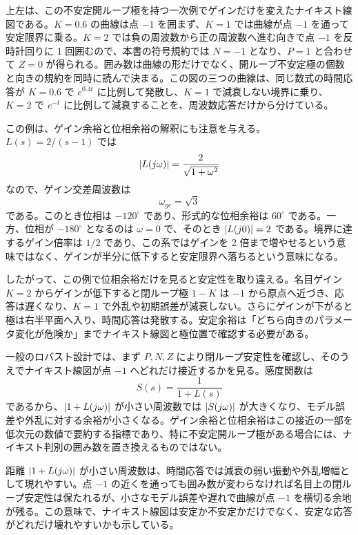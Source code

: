  上左は、この不安定開ループ極を持つ一次例でゲインだけを変えたナイキスト線図である。$K=0.6$ の曲線は点 $-1$ を囲まず、$K=1$ では曲線が点 $-1$ を通って安定限界に乗る。$K=2$ では負の周波数から正の周波数へ進む向きで点 $-1$ を反時計回りに 1 回囲むので、本書の符号規約では $N=-1$ となり、$P=1$ と合わせて $Z=0$ が得られる。囲み数は曲線の形だけでなく、開ループ不安定極の個数と向きの規約を同時に読んで決まる。この図の三つの曲線は、同じ数式の時間応答が $K=0.6$ で $e^{0.4t}$ に比例して発散し、$K=1$ で減衰しない境界に乗り、$K=2$ で $e^{-t}$ に比例して減衰することを、周波数応答だけから分けている。

この例は、ゲイン余裕と位相余裕の解釈にも注意を与える。$L(s)=2/(s-1)$ では
\begin{equation}
  \left|L(j\omega)\right|=\frac{2}{\sqrt{1+\omega^2}}
\end{equation}
なので、ゲイン交差周波数は
\begin{equation}
  \omega_{gc}=\sqrt{3}
\end{equation}
である。このとき位相は $-120^\circ$ であり、形式的な位相余裕は $60^\circ$ である。一方、位相が $-180^\circ$ となるのは $\omega=0$ で、そのとき $\left|L(j0)\right|=2$ である。境界に達するゲイン倍率は $1/2$ であり、この系ではゲインを 2 倍まで増やせるという意味ではなく、ゲインが半分に低下すると安定限界へ落ちるという意味になる。

したがって、この例で位相余裕だけを見ると安定性を取り違える。名目ゲイン $K=2$ からゲインが低下すると閉ループ極 $1-K$ は $-1$ から原点へ近づき、応答は遅くなり、$K=1$ で外乱や初期誤差が減衰しない。さらにゲインが下がると極は右半平面へ入り、時間応答は発散する。安定余裕は「どちら向きのパラメータ変化が危険か」までナイキスト線図と極位置で確認する必要がある。

一般のロバスト設計では、まず $P,N,Z$ により閉ループ安定性を確認し、そのうえでナイキスト線図が点 $-1$ へどれだけ接近するかを見る。感度関数は
\begin{equation}
  S(s)=\frac{1}{1+L(s)}
\end{equation}
であるから、$\left|1+L(j\omega)\right|$ が小さい周波数では $\left|S(j\omega)\right|$ が大きくなり、モデル誤差や外乱に対する余裕が小さくなる。ゲイン余裕と位相余裕はこの接近の一部を低次元の数値で要約する指標であり、特に不安定開ループ極がある場合には、ナイキスト判別の囲み数を置き換えるものではない。

距離 $\left|1+L(j\omega)\right|$ が小さい周波数は、時間応答では減衰の弱い振動や外乱増幅として現れやすい。点 $-1$ の近くを通っても囲み数が変わらなければ名目上の閉ループ安定性は保たれるが、小さなモデル誤差や遅れで曲線が点 $-1$ を横切る余地が残る。この意味で、ナイキスト線図は安定か不安定かだけでなく、安定な応答がどれだけ壊れやすいかも示している。


